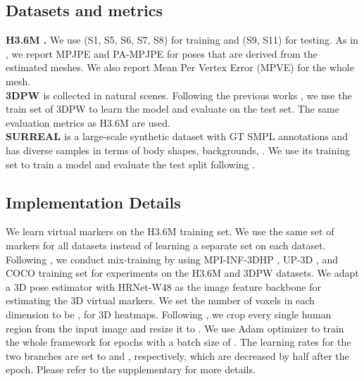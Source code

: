 \subsection{Datasets and metrics}
\label{subsec:dataset}
\noindent\textbf{H3.6M \cite{h36m_pami}.} We use (S1, S5, S6, S7, S8) for training and (S9, S11) for testing. 
As in \cite{kanazawa2018end, choi2020pose2mesh, lin2021end, Lin_2021_ICCV}, we report MPJPE and PA-MPJPE for poses that are derived from the estimated meshes. We also report Mean Per Vertex Error (MPVE) for the whole mesh.  \\


\noindent\textbf{3DPW \cite{vonMarcard2018}} is collected in natural scenes. 
Following the previous works \cite{lin2021end, Lin_2021_ICCV, Kocabas_2021_ICCV, zanfir2021thundr}, we use the train set of 3DPW to learn the model and evaluate on the test set. The same evaluation metrics as H3.6M are used.  \\

\noindent\textbf{SURREAL \cite{varol2017learning}} is a large-scale synthetic dataset with GT SMPL annotations and has diverse samples in terms of body shapes, backgrounds, \etc. We use its training set to train a model and evaluate the test split following \cite{choi2020pose2mesh}.


\subsection{Implementation Details}
\label{subsec:implementation}
We learn  virtual markers on the H3.6M \cite{h36m_pami} training set. We use the same set of markers for all datasets instead of learning a separate set on each dataset. Following \cite{kanazawa2018end, choi2020pose2mesh, moon2020i2l, zanfir2021thundr, kolotouros2019convolutional, kocabas2020vibe, Lin_2021_ICCV, lin2021end}, we conduct mix-training by using MPI-INF-3DHP \cite{mehta2017monocular}, UP-3D \cite{lassner2017unite}, and COCO \cite{lin2014microsoft} training set for experiments on the H3.6M and 3DPW datasets. 
We adapt a 3D pose estimator \cite{sun2018integral} with HRNet-W48 \cite{sun2019deep} as the image feature backbone for estimating the 3D virtual markers. We set the number of voxels in each dimension to be , \ie  for 3D heatmaps. Following \cite{kanazawa2018end, kolotouros2019convolutional, moon2020i2l}, we crop every single human region from the input image and resize it to .
We use Adam \cite{kingma2015adam} optimizer to train the whole framework for  epochs with a batch size of . The learning rates for the two branches are set to  and , respectively, which are decreased by half after the  epoch.
Please refer to the supplementary for more details.





